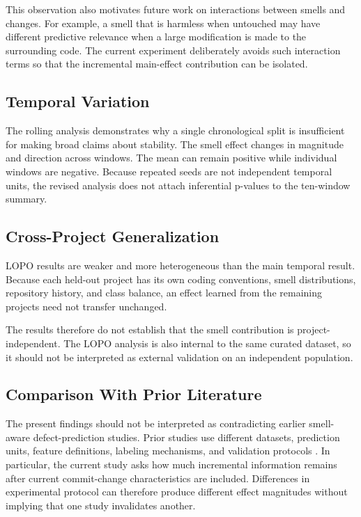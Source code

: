 \documentclass[conference]{IEEEtran}
\begin{document}
This observation also motivates future work on interactions between smells and changes. For example, a smell that is harmless when untouched may have different predictive relevance when a large modification is made to the surrounding code. The current experiment deliberately avoids such interaction terms so that the incremental main-effect contribution can be isolated.

\subsection{Temporal Variation}
The rolling analysis demonstrates why a single chronological split is insufficient for making broad claims about stability. The smell effect changes in magnitude and direction across windows. The mean can remain positive while individual windows are negative. Because repeated seeds are not independent temporal units, the revised analysis does not attach inferential p-values to the ten-window summary.

\subsection{Cross-Project Generalization}
LOPO results are weaker and more heterogeneous than the main temporal result. Because each held-out project has its own coding conventions, smell distributions, repository history, and class balance, an effect learned from the remaining projects need not transfer unchanged.

The results therefore do not establish that the smell contribution is project-independent. The LOPO analysis is also internal to the same curated dataset, so it should not be interpreted as external validation on an independent population.

\subsection{Comparison With Prior Literature}
The present findings should not be interpreted as contradicting earlier smell-aware defect-prediction studies. Prior studies use different datasets, prediction units, feature definitions, labeling mechanisms, and validation protocols \cite{hall2014smells,palomba2016teen,palomba2019smellaware,sottomayor2021cross}. In particular, the current study asks how much incremental information remains after current commit-change characteristics are included. Differences in experimental protocol can therefore produce different effect magnitudes without implying that one study invalidates another.
\end{document}
